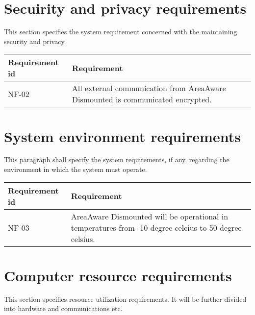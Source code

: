 

\section{Secuirity and privacy requirements}
This section specifies the system requirement concerned with the maintaining security and privacy.

\begin{longtable}{| p{3.2cm} |  p{10cm} | }
	\hline
	\textbf{Requirement id} &  \textbf{Requirement } \\
	\hline
	NF-02 & All external communication from AreaAware Dismounted is communicated encrypted.  \\
	\hline
\end{longtable}

\section{System environment requirements}
This paragraph shall specify the system requirements, if any, regarding the environment in which the system must operate.

\begin{longtable}{| p{3.2cm} |  p{10cm} | }
	\hline
	\textbf{Requirement id} &  \textbf{Requirement } \\
	\hline
	NF-03 & AreaAware Dismounted will be operational in temperatures from -10 degree celcius to 50 degree celsius.  \\
	\hline
\end{longtable}

\section{Computer resource requirements}
This section specifies resource utilization requirements. It will be further divided into hardware and communications etc.

